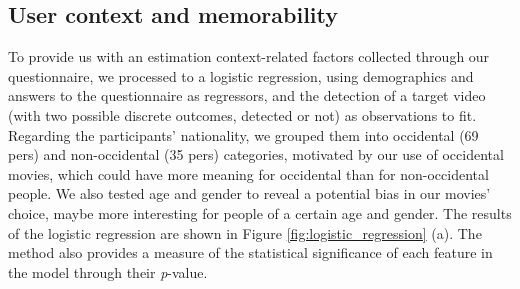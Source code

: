 \documentclass[sigconf]{acmart}
\begin{document}

\subsection{User context and memorability}
To provide us with an estimation context-related factors collected through our questionnaire, we processed to a logistic regression, using demographics and answers to the questionnaire as regressors, and the detection of a target video (with two possible discrete outcomes, detected or not) as observations to fit.
Regarding the participants' nationality, we grouped them into occidental (69 pers) and non-occidental (35 pers) categories, motivated by our use of occidental movies, which could have more meaning for occidental than for non-occidental people.
We also tested age and gender to reveal a potential bias in our movies' choice, maybe more interesting for people of a certain age and gender.
The results of the logistic regression are shown in Figure \ref{fig:logistic_regression} (a).
The method also provides a measure of the statistical significance of each feature in the model through their \textit{p}-value.
\end{document}
